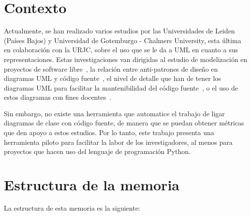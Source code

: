 \documentclass[a4paper, 12pt]{book}
\begin{document}
\section{Contexto}
\label{sec:contexto}

Actualmente, se han realizado varios estudios por las Universidades de Leiden (Países Bajos) y Universidad de Gotemburgo - Chalmers University, esta última en colaboración con la URJC, sobre el uso que se le da a UML en cuanto a sus representaciones. Estas investigaciones van dirigidas al estudio de modelización en proyectos de software libre~\cite{hebig2016quest}, la relación entre anti-patrones de diseño en diagramas UML y código fuente~\cite{karasneh2016studying}, el nivel de detalle que han de tener los diagramas UML para facilitar la mantenibilidad del código fuente~\cite{fernandez2016does}, o el uso de estos diagramas con fines docentes~\cite{karasneh2015using}.

Sin embargo, no existe una herramienta que automatice el trabajo de ligar diagramas de clase con código fuente, de manera que se puedan obtener métricas que den apoyo a estos estudios. Por lo tanto, este trabajo presenta una herramienta piloto para facilitar la labor de los investigadores, al menos para proyectos que hacen uso del lenguaje de programación Python.

\section{Estructura de la memoria}
\label{sec:estructura}

La estructura de esta memoria es la siguiente:
\end{document}
